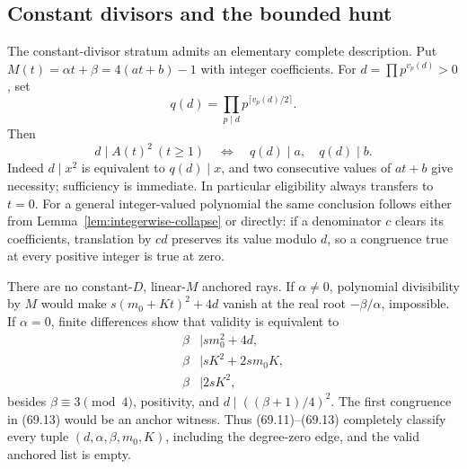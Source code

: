 \documentclass[10pt,reqno]{amsart}
\theoremstyle{definition}
\newcommand{\1}{\mathbf 1}
\begin{document}
\subsection{Constant divisors and the bounded hunt}
The constant-divisor stratum admits an elementary complete description.  Put
$M(t)=\alpha t+\beta=4(at+b)-1$ with integer coefficients.  For
$d=\prod p^{v_p(d)}>0$, set
\begin{equation}\tag{69.11}
 q(d)=\prod_{p\mid d}p^{\lceil v_p(d)/2\rceil}.
\end{equation}
Then
\begin{equation}\tag{69.12}
 d\mid A(t)^2\ (t\geq1)
 \quad\Longleftrightarrow\quad q(d)\mid a,\quad q(d)\mid b.
\end{equation}
Indeed $d\mid x^2$ is equivalent to $q(d)\mid x$, and two consecutive
values of $at+b$ give necessity; sufficiency is immediate.  In particular
eligibility always transfers to $t=0$.  For a general integer-valued
polynomial the same conclusion follows either from
Lemma~\ref{lem:integerwise-collapse} or directly: if a denominator $c$
clears its coefficients, translation by $cd$ preserves its value modulo
$d$, so a congruence true at every positive integer is true at zero.

There are no constant-$D$, linear-$M$ anchored rays.  If $\alpha\ne0$,
polynomial divisibility by $M$ would make
$s(m_0+Kt)^2+4d$ vanish at the real root $-\beta/\alpha$, impossible.  If
$\alpha=0$, finite differences show that validity is equivalent to
\begin{equation}\tag{69.13}
 \begin{split}
 \beta&\mid s m_0^2+4d,\\
 \beta&\mid sK^2+2s m_0K,\\
 \beta&\mid2sK^2,
 \end{split}
\end{equation}
besides $\beta\equiv3\pmod4$, positivity, and
$d\mid((\beta+1)/4)^2$.  The first congruence in (69.13) would be an anchor
witness.  Thus (69.11)--(69.13) completely classify every tuple
$(d,\alpha,\beta,m_0,K)$, including the degree-zero edge, and the valid
anchored list is empty.
\end{document}
